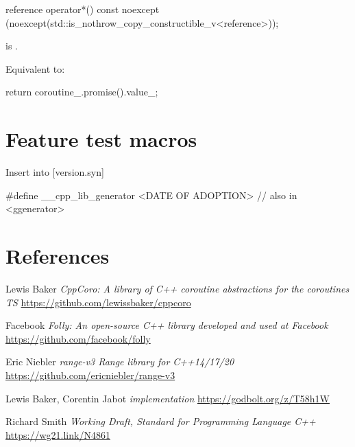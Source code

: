 \documentclass{wg21}
\begin{document}
\begin{addedblock}
\begin{itemdecl}
reference operator*() const
noexcept (noexcept(std::is_nothrow_copy_constructible_v<reference>));
\end{itemdecl}

\begin{itemdescr}
\precondition {} is .

\effects
Equivalent to:
\begin{codeblock}
    return coroutine_.promise().value_;
\end{codeblock}
\end{itemdescr}


\end{addedblock}

\section{Feature test macros}

Insert into [version.syn]

\begin{addedblock}
\begin{codeblock}
    #define __cpp_lib_generator <DATE OF ADOPTION> // also in <ggenerator>
\end{codeblock}
\end{addedblock}


\section{References}
\renewcommand{\section}[2]{}%



\begin{thebibliography}{9}
    Lewis Baker
    \emph{CppCoro: A library of C++ coroutine abstractions for the coroutines TS}\newline
    \url{https://github.com/lewissbaker/cppcoro}

    Facebook
    \emph{Folly: An open-source C++ library developed and used at Facebook}\newline
    \url{https://github.com/facebook/folly}


    Eric Niebler
    \emph{range-v3 Range library for C++14/17/20}\newline
    \url{https://github.com/ericniebler/range-v3}

    Lewis Baker, Corentin Jabot
    \emph{ implementation}\newline
    \url{https://godbolt.org/z/T58h1W}

    Richard Smith
    \emph{Working Draft, Standard for Programming Language C++}\newline
    \url{https://wg21.link/N4861}


\end{thebibliography}
\end{document}
